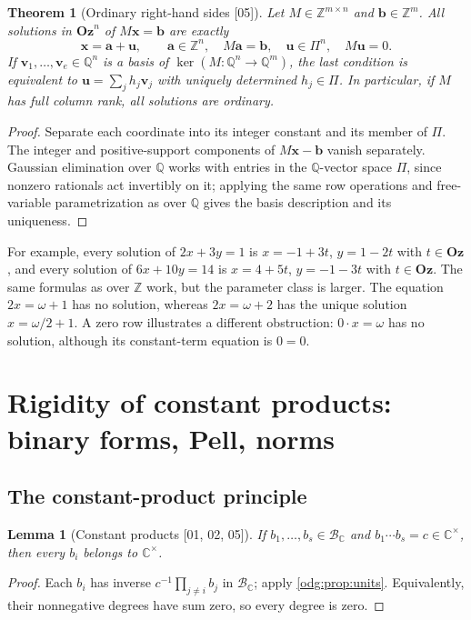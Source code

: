 \documentclass[11pt,oneside]{article}
\numberwithin{equation}{section}
\newtheorem{theorem}{Theorem}[section]
\newtheorem{lemma}[lemma]{Lemma}
\theoremstyle{definition}
\theoremstyle{remark}
\newcommand{\Oz}{\mathbf{Oz}}
\newcommand{\Z}{\mathbb Z}
\newcommand{\Q}{\mathbb Q}
\newcommand{\C}{\mathbb C}
\newcommand{\BC}{\mathcal B_{\C}}
\newcommand{\src}[1]{\textup{\textsf{\small[#1]}}}
\begin{document}
\begin{theorem}[Ordinary right-hand sides \src{05}]\label{odg:thm:linear}
Let $M\in\Z^{m\times n}$ and $\mathbf b\in\Z^m$. All solutions in $\Oz^n$
of $M\mathbf x=\mathbf b$ are exactly
\[
 \mathbf x=\mathbf a+\mathbf u,
 \qquad \mathbf a\in\Z^n,\quad M\mathbf a=\mathbf b,
 \quad \mathbf u\in\Pi^n,\quad M\mathbf u=0.
\]
If $\mathbf v_1,\ldots,\mathbf v_e\in\Q^n$ is a basis of
$\ker(M:\Q^n\to\Q^m)$, the last condition is equivalent to
$\mathbf u=\sum_{j}h_j\mathbf v_j$ with uniquely determined $h_j\in\Pi$.
In particular, if $M$ has full column rank, all solutions are ordinary.
\end{theorem}
\begin{proof}
Separate each coordinate into its integer constant and its member of $\Pi$.
The integer and positive-support components of $M\mathbf x-\mathbf b$
vanish separately. Gaussian elimination over $\Q$ works with entries in the
$\Q$-vector space $\Pi$, since nonzero rationals act invertibly on it;
applying the same row operations and free-variable parametrization as over
$\Q$ gives the basis description and its uniqueness.
\end{proof}

For example, every solution of $2x+3y=1$ is $x=-1+3t$, $y=1-2t$ with
$t\in\Oz$, and every solution of $6x+10y=14$ is $x=4+5t$, $y=-1-3t$ with
$t\in\Oz$. The same formulas as over $\Z$ work, but the parameter class is
larger. The equation $2x=\omega+1$ has no solution, whereas $2x=\omega+2$ has
the unique solution $x=\omega/2+1$. A zero row illustrates a different
obstruction: $0\cdot x=\omega$ has no solution, although its constant-term
equation is $0=0$.

\section{Rigidity of constant products: binary forms, Pell, norms}\label{odg:sec:rigidity}

\subsection{The constant-product principle}

\begin{lemma}[Constant products \src{01, 02, 05}]\label{odg:lem:constantproduct}
If $b_1,\ldots,b_s\in\BC$ and $b_1\cdots b_s=c\in\C^\times$, then every
$b_i$ belongs to $\C^\times$.
\end{lemma}
\begin{proof}
Each $b_i$ has inverse $c^{-1}\prod_{j\ne i}b_j$ in $\BC$; apply
\cref{odg:prop:units}. Equivalently, their nonnegative degrees have sum
zero, so every degree is zero.
\end{proof}
\end{document}
